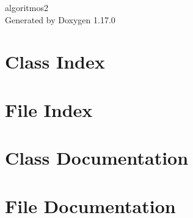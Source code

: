 \documentclass[twoside]{book}
\newcommand{\+}{\discretionary{\mbox{\scriptsize$\hookleftarrow$}}{}{}}
\newcommand{\clearemptydoublepage}{%
    \newpage{\pagestyle{empty}\cleardoublepage}%
  }
\begin{document}
  \raggedbottom
    \hypersetup{pageanchor=false,
                bookmarksnumbered=true,
                pdfencoding=unicode
               }
  \begin{titlepage}
  \vspace*{7cm}
  \begin{center}%
  {\Large algoritmos2}\\
  \vspace*{1cm}
  {\large Generated by Doxygen 1.17.0}\\
  \end{center}
  \end{titlepage}
  \clearemptydoublepage
  \tableofcontents
  \clearemptydoublepage
  \hypersetup{pageanchor=true}
\chapter{Class Index}

\chapter{File Index}

\chapter{Class Documentation}

\chapter{File Documentation}











  \backmatter
  \newpage
  \clearemptydoublepage
  \printindex
\end{document}
